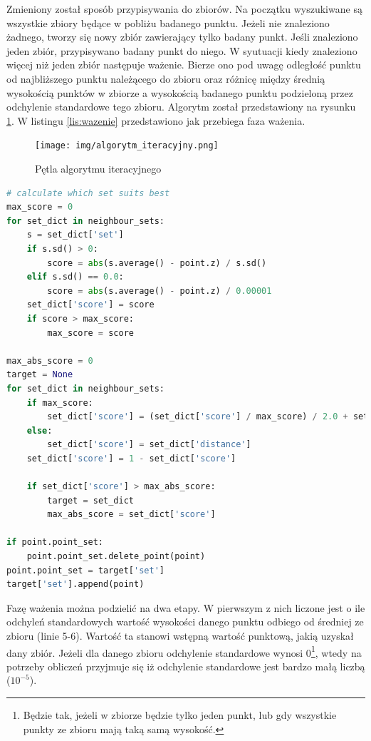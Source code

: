 Zmieniony został sposób przypisywania do zbiorów. Na początku wyszukiwane są wszystkie zbiory będące w pobliżu badanego punktu.
Jeżeli nie znaleziono żadnego, tworzy się nowy zbiór zawierający tylko badany punkt.
Jeśli znaleziono jeden zbiór, przypisywano badany punkt do niego.
W syutuacji kiedy znaleziono więcej niż jeden zbiór następuje ważenie. Bierze ono pod uwagę odległość punktu od najbliższego
punktu należącego do zbioru oraz różnicę między średnią wysokością punktów w zbiorze a wysokością badanego punktu podzieloną
przez odchylenie standardowe tego zbioru. Algorytm został przedstawiony na rysunku \ref{fig:algorytm_iteracyjny}. W listingu
\ref{lis:wazenie} przedstawiono jak przebiega faza ważenia.

\begin{figure}[h!]
    \centering
    \texttt{[image: img/algorytm\_iteracyjny.png]}
    \caption{Pętla algorytmu iteracyjnego}
    \label{fig:algorytm_iteracyjny}
\end{figure}

\begin{lstlisting}[frame=L, language=python, label={lis:wazenie}, caption={Ważenie punktów w algorytmie iteracyjnym}]
# calculate which set suits best
max_score = 0
for set_dict in neighbour_sets:
    s = set_dict['set']
    if s.sd() > 0:
        score = abs(s.average() - point.z) / s.sd()
    elif s.sd() == 0.0:
        score = abs(s.average() - point.z) / 0.00001
    set_dict['score'] = score
    if score > max_score:
        max_score = score

max_abs_score = 0
target = None
for set_dict in neighbour_sets:
    if max_score:
        set_dict['score'] = (set_dict['score'] / max_score) / 2.0 + set_dict['distance']
    else:
        set_dict['score'] = set_dict['distance']
    set_dict['score'] = 1 - set_dict['score']

    if set_dict['score'] > max_abs_score:
        target = set_dict
        max_abs_score = set_dict['score']

if point.point_set:
    point.point_set.delete_point(point)
point.point_set = target['set']
target['set'].append(point)
\end{lstlisting}

Fazę ważenia można podzielić na dwa etapy. W pierwszym z nich liczone jest o ile odchyleń standardowych
wartość wysokości danego punktu odbiego od średniej ze zbioru (linie 5-6). Wartość ta stanowi wstępną wartość punktową, jakią uzyskał dany zbiór.
Jeżeli dla danego zbioru odchylenie standardowe wynosi 0\footnote{Będzie tak, jeżeli w zbiorze będzie tylko jeden punkt,
lub gdy wszystkie punkty ze zbioru mają taką samą wysokość.},
wtedy na potrzeby obliczeń przyjmuje się iż odchylenie standardowe jest bardzo małą liczbą ($10^{-5}$).

